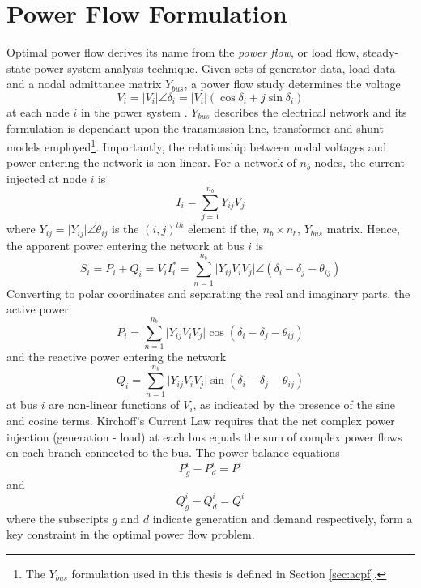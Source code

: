 \section{Power Flow Formulation}
\label{sec:pf_form}
Optimal power flow derives its name from the \textit{power flow}, or load flow,
steady-state power system analysis technique.  Given sets of generator data,
load data and a nodal admittance matrix $Y_{bus}$, a power flow study
determines the voltage
\begin{equation}
V_i = \vert V_i \vert \angle\delta_i = \vert
V_i\vert(\cos\delta_i + j\sin\delta_i)
\end{equation}
at each node $i$ in the power system \cite{grainger:psa}. $Y_{bus}$ describes
the electrical network and its formulation is dependant upon the transmission
line, transformer and shunt models employed\footnote{The $Y_{bus}$
formulation used in this thesis is defined in Section \ref{sec:acpf}.}.
Importantly, the relationship between nodal voltages and power entering the
network is non-linear.  For a network of $n_b$ nodes, the current injected at
node $i$ is
\begin{equation}
I_i = \sum_{j=1}^{n_b} Y_{ij} V_j
\end{equation}
where $Y_{ij} = \vert Y_{ij}\vert \angle\theta_{ij}$ is the $(i,j)^{th}$ element
if the, $n_b \times n_b$, $Y_{bus}$ matrix.  Hence, the apparent power entering
the network at bus $i$ is
\begin{equation}
S_i = P_i+Q_i = V_iI_i^* = \sum_{n=1}^{n_b} \vert Y_{ij}V_iV_j \vert \angle
(\delta_i - \delta_j - \theta_{ij})
\end{equation}
Converting to polar coordinates and separating the real and imaginary parts,
the active power
\begin{equation}
P_i = \sum_{n=1}^{n_b} \vert Y_{ij}V_iV_j \vert \cos(\delta_i - \delta_j -
\theta_{ij})
\end{equation}
and the reactive power entering the network
\begin{equation}
Q_i = \sum_{n=1}^{n_b} \vert Y_{ij}V_iV_j \vert \sin(\delta_i - \delta_j -
\theta_{ij})
\end{equation}
at bus $i$ are non-linear functions of $V_i$, as indicated by the presence of
the sine and cosine terms.  Kirchoff's Current Law requires that the net
complex power injection (generation - load) at each bus equals the sum of
complex power flows on each branch connected to the bus.  The power balance
equations
\begin{equation}
\label{eq:p_balance}
P_g^i - P_d^i = P^i
\end{equation}
and
\begin{equation}
\label{eq:q_balance}
Q_g^i - Q_d^i = Q^i
\end{equation}
where the subscripts $g$ and $d$ indicate generation and demand
respectively, form a key constraint in the optimal power flow problem.

